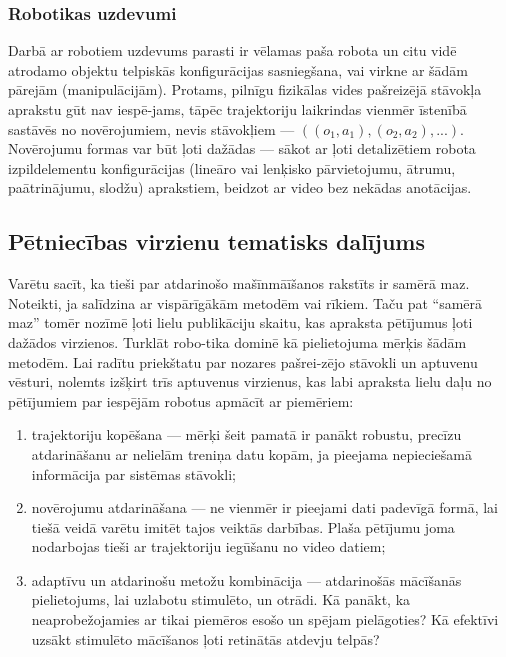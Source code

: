 \documentclass[12pt, a4paper]{article}
\numberwithin{equation}{section} %
\begin{document}
\subsubsection{Robotikas uzdevumi}

Darbā ar robotiem uzdevums parasti ir vēlamas paša robota un citu vidē atrodamo objektu telpiskās konfigurācijas sasniegšana, vai virkne ar šādām pārejām (manipulācijām). Protams, pilnīgu fizikālas vides pašreizējā stāvokļa aprakstu gūt nav iespē-jams, tāpēc trajektoriju laikrindas vienmēr īstenībā sastāvēs no novērojumiem, nevis stāvokļiem --- $((o_1,a_1), (o_2, a_2), ...)$. Novērojumu formas var būt ļoti dažādas --- sākot ar ļoti detalizētiem robota izpildelementu konfigurācijas (lineāro vai lenķisko pārvietojumu, ātrumu, paātrinājumu, slodžu) aprakstiem, beidzot ar video bez nekādas anotācijas.

\subsection{Pētniecības virzienu tematisks dalījums}

Varētu sacīt, ka tieši par atdarinošo mašīnmāīšanos rakstīts ir samērā maz. Noteikti, ja salīdzina ar vispārīgākām metodēm vai rīkiem. Taču pat ``samērā maz'' tomēr nozīmē ļoti lielu publikāciju skaitu, kas apraksta pētījumus ļoti dažādos virzienos. Turklāt robo-tika dominē kā pielietojuma mērķis šādām metodēm. Lai radītu priekštatu par nozares pašrei-zējo stāvokli un aptuvenu vēsturi, nolemts izšķirt trīs aptuvenus virzienus, kas labi apraksta lielu daļu no pētījumiem par iespējām robotus apmācīt ar piemēriem:

\begin{enumerate}
    \item trajektoriju kopēšana --- mērķi šeit pamatā ir panākt robustu, precīzu atdarināšanu ar nelielām treniņa datu kopām, ja pieejama nepieciešamā informācija par sistēmas stāvokli;
    \item novērojumu atdarināšana --- ne vienmēr ir pieejami dati padevīgā formā, lai tiešā veidā varētu imitēt tajos veiktās darbības. Plaša pētījumu joma nodarbojas tieši ar trajektoriju iegūšanu no video datiem;
    \item adaptīvu un atdarinošu metožu kombinācija --- atdarinošās mācīšanās pielietojums, lai uzlabotu stimulēto, un otrādi. Kā panākt, ka neaprobežojamies ar tikai piemēros esošo un spējam pielāgoties? Kā efektīvi uzsākt stimulēto mācīšanos ļoti retinātās atdevju telpās?
\end{enumerate}
\end{document}
